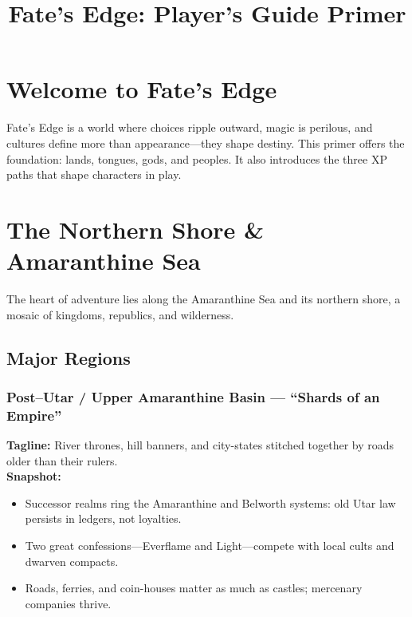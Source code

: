 \documentclass[11pt]{book}
\begin{document}
\title{Fate's Edge: Player's Guide Primer}
\author{}
\date{}
\maketitle

\tableofcontents

\chapter{Welcome to Fate's Edge}
Fate's Edge is a world where choices ripple outward, magic is perilous, and cultures define more than appearance—they shape destiny. 
This primer offers the foundation: lands, tongues, gods, and peoples. It also introduces the three XP paths that shape characters in play.

\chapter{The Northern Shore \& Amaranthine Sea}
The heart of adventure lies along the Amaranthine Sea and its northern shore, a mosaic of kingdoms, republics, and wilderness.

\section{Major Regions}
\subsection*{Post–Utar / Upper Amaranthine Basin — “Shards of an Empire”}
\textbf{Tagline:} River thrones, hill banners, and city-states stitched together by roads older than their rulers.\\
\textbf{Snapshot:}
\begin{itemize}
  \item Successor realms ring the Amaranthine and Belworth systems: old Utar law persists in ledgers, not loyalties.
  \item Two great confessions—Everflame and Light—compete with local cults and dwarven compacts.
  \item Roads, ferries, and coin-houses matter as much as castles; mercenary companies thrive.
\end{itemize}
\end{document}
